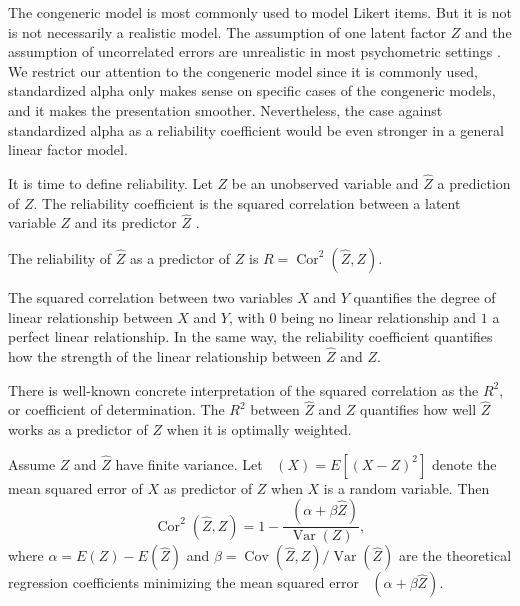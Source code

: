 \documentclass[twoside]{article}
\DeclareMathOperator{\Var}{Var}
\DeclareMathOperator{\Cor}{Cor}
\DeclareMathOperator{\Cov}{Cov}
\DeclareMathOperator{\MSE}{MSE_Z}
\begin{document}
The congeneric model is most commonly used to model Likert items. But it is not is not necessarily a realistic model. The assumption of one latent factor $Z$ and the assumption of uncorrelated errors are unrealistic in most psychometric settings \citep[][Section 1.2 -- 1.3]{Green2009-le}. We restrict our attention to the congeneric model since it is commonly used, standardized alpha only makes sense on specific cases of the congeneric models, and it makes the presentation smoother. Nevertheless, the case against standardized alpha as a reliability coefficient would be even stronger in a general linear factor model. 

It is time to define reliability. Let $Z$ be an unobserved variable and $\hat{Z}$ a prediction of $Z$. The reliability coefficient is the squared correlation between a latent variable $Z$ and its predictor $\hat{Z}$ \citep[][p. 61]{Lord1968-ax}. 

\begin{defn}\label{defn:reliability} The reliability of $\hat{Z}$ as a predictor of $Z$ is $ R=\Cor^{2}(\hat{Z},Z)$.
\end{defn} 

The squared correlation between two variables $X$ and $Y$ quantifies the degree of linear relationship between $X$ and $Y$, with $0$ being no linear relationship and $1$ a perfect linear relationship. In the same way, the reliability coefficient quantifies how the strength of the linear relationship between $\hat{Z}$ and $Z$.

There is well-known concrete interpretation of the squared correlation as the $R^2$, or coefficient of determination. The $R^2$ between $\hat{Z}$ and $Z$ quantifies how well $\hat{Z}$ works as a predictor of $Z$ when it is optimally weighted.

\begin{lem}
\label{lem:r^2 and correlation}Assume $Z$ and $\hat{Z}$ have finite
variance. Let $\MSE(X) = E[(X-Z)^2]$ denote the mean squared error of $X$ as predictor of $Z$ when $X$ is a random variable. Then 
\begin{equation}
\Cor^{2}(\hat{Z},Z)=1-\frac{\MSE(\alpha+\beta\hat{Z})}{\Var(Z)},\label{eq:rsq and correlation}
\end{equation}
where $\alpha=E(Z)-E(\hat{Z})$ and $\beta=\Cov(\hat{Z},Z)/\Var(\hat{Z})$ are the theoretical regression coefficients minimizing the mean squared error $\MSE(\alpha+\beta\hat{Z})$. 
\end{lem}
\end{document}
